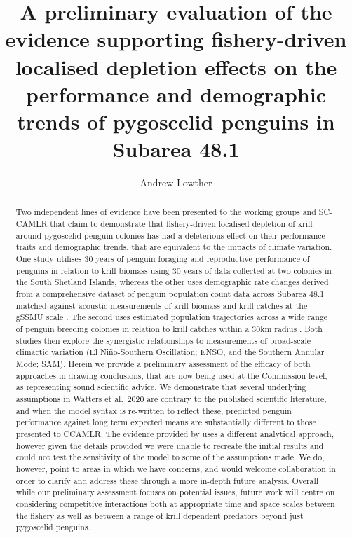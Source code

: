 \documentclass[]{elsarticle} %
\begin{document}
\begin{frontmatter}

  \title{A preliminary evaluation of the evidence supporting
fishery-driven localised depletion effects on the performance and
demographic trends of pygoscelid penguins in Subarea 48.1}
    \author[]{Andrew Lowther%
  }
  
  \begin{abstract}
  Two independent lines of evidence have been presented to the working
  groups and SC-CAMLR that claim to demonstrate that fishery-driven
  localised depletion of krill around pygoscelid penguin colonies has
  had a deleterious effect on their performance traits and demographic
  trends, that are equivalent to the impacts of climate variation. One
  study utilises 30 years of penguin foraging and reproductive
  performance of penguins in relation to krill biomass using 30 years of
  data collected at two colonies in the South Shetland Islands, whereas
  the other uses demographic rate changes derived from a comprehensive
  dataset of penguin population count data across Subarea 48.1 matched
  against acoustic measurements of krill biomass and krill catches at
  the gSSMU scale \citep{Watters2020}. The second uses estimated
  population trajectories across a wide range of penguin breeding
  colonies in relation to krill catches within a 30km radius
  \citep{Kruger2021}. Both studies then explore the synergistic
  relationships to measurements of broad-scale climactic variation (El
  Niño-Southern Oscillation; ENSO, and the Southern Annular Mode; SAM).
  Herein we provide a preliminary assessment of the efficacy of both
  approaches in drawing conclusions, that are now being used at the
  Commission level, as representing sound scientific advice. We
  demonstrate that several underlying assumptions in Watters et al.~2020
  are contrary to the published scientific literature, and when the
  model syntax is re-written to reflect these, predicted penguin
  performance against long term expected means are substantially
  different to those presented to CCAMLR. The evidence provided by
  \citet{Kruger2021} uses a different analytical approach, however given
  the details provided we were unable to recreate the initial results
  and could not test the sensitivity of the model to some of the
  assumptions made. We do, however, point to areas in which we have
  concerns, and would welcome collaboration in order to clarify and
  address these through a more in-depth future analysis. Overall while
  our preliminary assessment focuses on potential issues, future work
  will centre on considering competitive interactions both at
  appropriate time and space scales between the fishery as well as
  between a range of krill dependent predators beyond just pygoscelid
  penguins.
  \end{abstract}
  
 \end{frontmatter}
\end{document}
